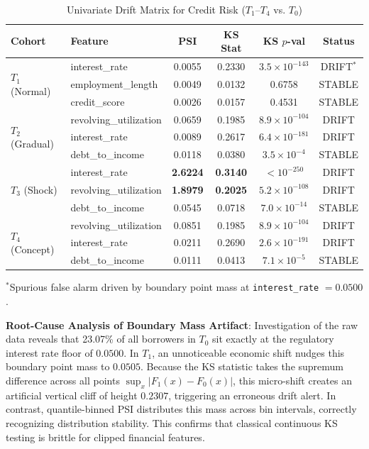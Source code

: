 \documentclass[conference]{IEEEtran}
\begin{document}
\begin{table}[t]
\caption{Univariate Drift Matrix for Credit Risk ($T_1$--$T_4$ vs. $T_0$)}
\label{tab:univariate_fintech}
\centering
\small
\setlength{\tabcolsep}{6pt}
\begin{tabular*}{\textwidth}{@{\extracolsep{\fill}}llcccc}
\toprule
\textbf{Cohort} & \textbf{Feature} & \textbf{PSI} & \textbf{KS Stat} & \textbf{KS $p$-val} & \textbf{Status} \\
\midrule
\multirow{3}{*}{$T_1$ (Normal)} 
& interest\_rate & 0.0055 & 0.2330 & $3.5\times 10^{-143}$ & DRIFT$^*$ \\
& employment\_length & 0.0049 & 0.0132 & 0.6758 & STABLE \\
& credit\_score & 0.0026 & 0.0157 & 0.4531 & STABLE \\
\midrule
\multirow{3}{*}{$T_2$ (Gradual)} 
& revolving\_utilization & 0.0659 & 0.1985 & $8.9\times 10^{-104}$ & DRIFT \\
& interest\_rate & 0.0089 & 0.2617 & $6.4\times 10^{-181}$ & DRIFT \\
& debt\_to\_income & 0.0118 & 0.0380 & $3.5\times 10^{-4}$ & STABLE \\
\midrule
\multirow{3}{*}{$T_3$ (Shock)} 
& interest\_rate & \textbf{2.6224} & \textbf{0.3140} & $< 10^{-250}$ & DRIFT \\
& revolving\_utilization & \textbf{1.8979} & \textbf{0.2025} & $5.2\times 10^{-108}$ & DRIFT \\
& debt\_to\_income & 0.0545 & 0.0718 & $7.0\times 10^{-14}$ & STABLE \\
\midrule
\multirow{3}{*}{$T_4$ (Concept)} 
& revolving\_utilization & 0.0851 & 0.1985 & $8.9\times 10^{-104}$ & DRIFT \\
& interest\_rate & 0.0211 & 0.2690 & $2.6\times 10^{-191}$ & DRIFT \\
& debt\_to\_income & 0.0111 & 0.0413 & $7.1\times 10^{-5}$ & STABLE \\
\bottomrule
\end{tabular*}
\vspace{1ex}
{\footnotesize $^*$Spurious false alarm driven by boundary point mass at \texttt{interest\_rate} $=0.0500$.}
\end{table}

\textbf{Root-Cause Analysis of Boundary Mass Artifact}: Investigation of the raw data reveals that 23.07\% of all borrowers in $T_0$ sit exactly at the regulatory interest rate floor of $0.0500$. In $T_1$, an unnoticeable economic shift nudges this boundary point mass to $0.0505$. Because the KS statistic takes the supremum difference across all points $\sup_x |F_1(x) - F_0(x)|$, this micro-shift creates an artificial vertical cliff of height $0.2307$, triggering an erroneous drift alert. In contrast, quantile-binned PSI distributes this mass across bin intervals, correctly recognizing distribution stability. This confirms that classical continuous KS testing is brittle for clipped financial features.
\end{document}
